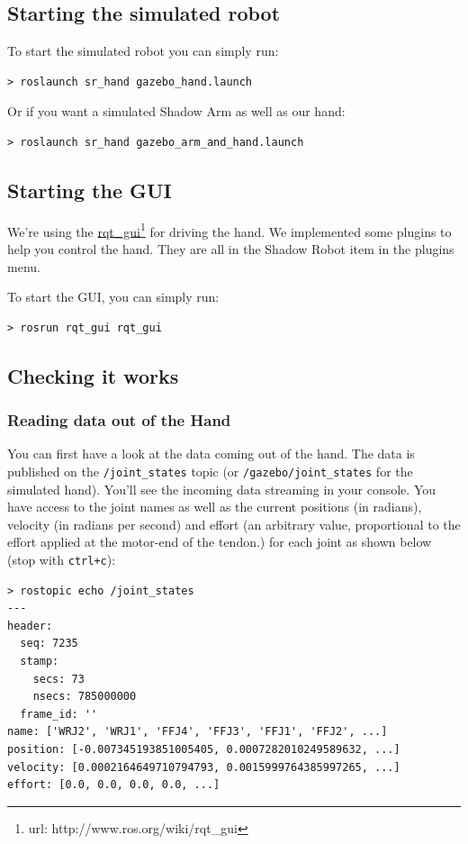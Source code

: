 \documentclass[12pt]{article}
\newcommand{\betterhref}[2]{\href{#1}{#2}\footnote{url: #1}}
\begin{document}
\subsection{Starting the simulated robot}
\label{sec:start-simul-hand}
\par To start the simulated robot you can simply run:
  \begin{lstlisting}[escapeinside='']
> roslaunch sr_hand gazebo_hand.launch
  \end{lstlisting}

\par Or if you want a simulated Shadow Arm as well as our hand:
  \begin{lstlisting}[escapeinside='']
> roslaunch sr_hand gazebo_arm_and_hand.launch
  \end{lstlisting}

\subsection{Starting the GUI}
\label{sec:start-gui}
\par We're using the \betterhref{http://www.ros.org/wiki/rqt\_gui}{rqt\_gui} for driving the hand. We implemented some plugins to help you control the hand. They are all in the Shadow Robot item in the plugins menu.

\par To start the GUI, you can simply run:
  \begin{lstlisting}[escapeinside='']
> rosrun rqt_gui rqt_gui
  \end{lstlisting}

\subsection{Checking it works}
\label{sec:checking-it-works}

\subsubsection{Reading data out of the Hand}
\par You can first have a look at the data coming out of the hand. The data is published on the \texttt{/joint\_states} topic (or \texttt{/gazebo/joint\_states} for the simulated hand). You'll see the incoming data streaming in your console. You have access to the joint names as well as the current positions (in radians), velocity (in radians per second) and effort (an arbitrary value, proportional to the effort applied at the motor-end of the tendon.) for each joint as shown below (stop with \texttt{ctrl+c}):
  \begin{lstlisting}[escapeinside='']
> rostopic echo /joint_states
---
header:
  seq: 7235
  stamp:
    secs: 73
    nsecs: 785000000
  frame_id: ''
name: ['WRJ2', 'WRJ1', 'FFJ4', 'FFJ3', 'FFJ1', 'FFJ2', ...]
position: [-0.007345193851005405, 0.0007282010249589632, ...]
velocity: [0.0002164649710794793, 0.0015999764385997265, ...]
effort: [0.0, 0.0, 0.0, 0.0, ...]
  \end{lstlisting}
\end{document}
